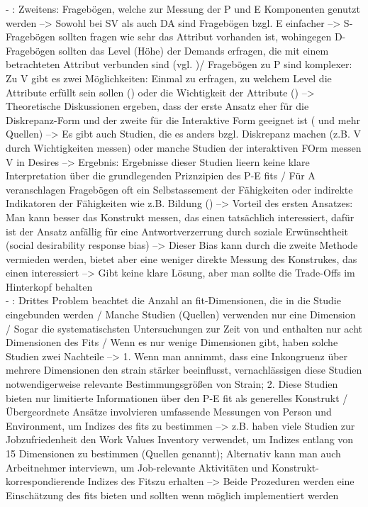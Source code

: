 - \cite[S. 8]{edwards:1990}: Zweitens: Fragebögen, welche zur Messung der P und E Komponenten genutzt werden --> Sowohl bei SV als auch DA sind Fragebögen bzgl. E einfacher --> S-Fragebögen sollten fragen wie sehr das Attribut vorhanden ist, wohingegen D-Fragebögen sollten das Level (Höhe) der Demands erfragen, die mit einem betrachteten Attribut verbunden sind (vgl. \textcite{jobDemandsAndWorkerHealth:1975})/ Fragebögen zu P sind komplexer: Zu V gibt es zwei Möglichkeiten: Einmal zu erfragen, zu welchem Level die Attribute erfüllt sein sollen (\textcite{jobDemandsAndWorkerHealth:1975}) oder die Wichtigkeit der Attribute (\textcite{workAdjustment:1964}) --> Theoretische Diskussionen ergeben, dass der erste Ansatz eher für die Diskrepanz-Form und der zweite für die Interaktive Form geeignet ist (\textcite{copingAndAdaption:1974} und mehr Quellen) --> Es gibt auch Studien, die es anders bzgl. Diskrepanz machen (z.B. V durch Wichtigkeiten messen) oder manche Studien der interaktiven FOrm messen V in Desires --> Ergebnis: Ergebnisse dieser Studien lieern keine klare Interpretation über die grundlegenden Priznzipien des P-E fits / Für A veranschlagen Fragebögen oft ein Selbstassement der Fähigkeiten  oder indirekte Indikatoren der Fähigkeiten wie z.B. Bildung (\textcite{jobDemandsAndWorkerHealth:1975}) --> Vorteil des ersten Ansatzes: Man kann besser das Konstrukt messen, das einen tatsächlich interessiert, dafür ist der Ansatz anfällig für eine Antwortverzerrung durch soziale Erwünschtheit (social desirability response bias) --> Dieser Bias kann durch die zweite Methode vermieden werden, bietet aber eine weniger direkte Messung des Konstrukes, das einen interessiert --> Gibt keine klare Lösung, aber man sollte die Trade-Offs im Hinterkopf behalten \\
- \cite[S. 8f.]{edwards:1990}: Drittes Problem beachtet die Anzahl an fit-Dimensionen, die in die Studie eingebunden werden / Manche Studien (Quellen) verwenden nur eine Dimension / Sogar die systematischsten Untersuchungen zur Zeit von \cite{copingAndAdaption:1974} und \cite{mechanismsOfJobStressAndStrain:1982} enthalten nur acht Dimensionen des Fits / Wenn es nur wenige Dimensionen gibt, haben solche Studien zwei Nachteile --> 1. Wenn man annimmt, dass eine Inkongruenz über mehrere Dimensionen den strain stärker beeinflusst, vernachlässigen diese Studien notwendigerweise relevante Bestimmungsgrößen von Strain; 2. Diese Studien bieten nur limitierte Informationen über den P-E fit als generelles Konstrukt / Übergeordnete Ansätze involvieren umfassende Messungen von Person und Environment, um Indizes des fits zu bestimmen --> z.B. haben viele Studien zur Jobzufriedenheit den Work Values Inventory verwendet, um Indizes entlang von 15 Dimensionen zu bestimmen (Quellen genannt); Alternativ kann man auch Arbeitnehmer interviewn, um Job-relevante Aktivitäten und Konstrukt-korrespondierende Indizes des Fitszu erhalten --> Beide Prozeduren werden eine Einschätzung des fits bieten und sollten wenn möglich implementiert werden

